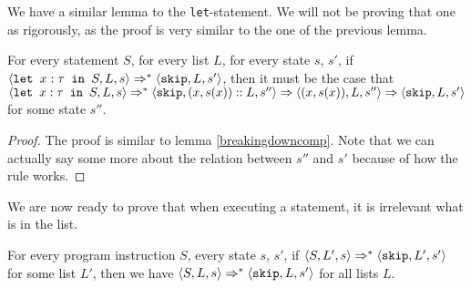 We have a similar lemma to the \texttt{let}-statement. We will not be proving that one as rigorously, as the proof is very similar to the one of the previous lemma. 

\begin{lemma}
\label{breakingdownlet}
For every statement $S$, for every list $L$, for every state $s$, $s'$, if $\langle \texttt{let }x : \tau \texttt{ in } S, L, s \rangle \Rightarrow ^{*} \langle \texttt{skip}, L, s' \rangle$, then it must be the case that $\langle \texttt{let }x : \tau \texttt{ in } S, L, s \rangle \Rightarrow ^{*} \langle \texttt{skip}, (x,s(x))::L, s'' \rangle \Rightarrow \langle (x,s(x)), L, s'' \rangle \Rightarrow \langle \texttt{skip}, L, s' \rangle$ for some state $s''$. 
\end{lemma}

\begin{proof}
The proof is similar to lemma \ref{breakingdowncomp}. Note that we can actually say some more about the relation between $s''$ and $s'$ because of how the rule \setsos works. 
\end{proof}

We are now ready to prove that when executing a statement, it is irrelevant what is in the list.  

\begin{proposition}
For every program instruction $S$, every state $s$, $s'$, if $\langle S, L', s \rangle \Rightarrow ^{*} \langle \texttt{skip}, L', s' \rangle$ for some list $L'$, then we have $\langle S, L, s \rangle \Rightarrow ^{*} \langle \texttt{skip}, L, s' \rangle$ for all lists $L$. 
\end{proposition}

